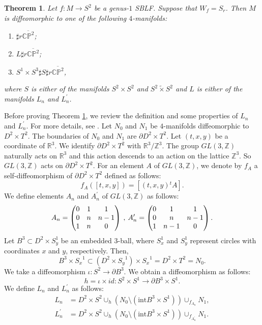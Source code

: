 \documentclass{amsart}
\theoremstyle{plain}
\newtheorem{thm}{Theorem}[section]
\theoremstyle{definition}
\begin{document}
\begin{thm}\label{aboutS_r}
Let $f:M\rightarrow S^2$ be a genus-$1$ SBLF. 
Suppose that $W_f=S_r$. 
Then $M$ is diffeomorphic to one of the following $4$-manifolds: 
\begin{enumerate}[(1)]

\item $\sharp r\overline{\mathbb{CP}^2}$; 

\item $L\sharp r\overline{\mathbb{CP}^2}$; 

\item $S^1\times S^3\sharp S \sharp r\overline{\mathbb{CP}^2}$, 

\end{enumerate}
\noindent
where $S$ is either of the manifolds $S^2\times S^2$ and $S^2\tilde{\times}S^2$ 
and $L$ is either of the manifolds $L_n$ and $L_n^\prime$. 

\end{thm}

Before proving Theorem \ref{aboutS_r}, we review the definition and some properties of $L_n$ and $L_n^\prime$. 
For more details, see \cite{Pao}. 
Let $N_0$ and $N_1$ be $4$-manifolds diffeomorphic to $D^2\times T^2$. 
The boundaries of $N_0$ and $N_1$ are $\partial D^2\times T^2$. 
Let $(t,x,y)$ be a coordinate of $\mathbb{R}^3$. 
We identify $\partial D^2\times T^2$ with $\mathbb{R}^3/\mathbb{Z}^3$. 
The group $GL(3,\mathbb{Z})$ naturally acts on $\mathbb{R}^3$ and this action descends to an action on the lattice $\mathbb{Z}^3$. 
So $GL(3,\mathbb{Z})$ acts on $\partial D^2\times T^2$. 
For an element $A$ of $GL(3,\mathbb{Z})$, we denote by $f_A$ a self-diffeomorphism of $\partial D^2\times T^2$ defined as follows: 
\[
f_A([t,x,y])=[(t,x,y){}^tA]. 
\]
We define elements $A_n$ and $A_n^\prime$ of $GL(3,\mathbb{Z})$ as follows: 
\[
A_n=
\begin{pmatrix}
0 & 1 & 1 \\
0 & n & n-1 \\
1 & n & 0 
\end{pmatrix}
\hspace{0.2em},\hspace{0.2em}
A_n^\prime=
\begin{pmatrix}
0 & 1 & 1 \\
0 & n & n-1 \\
1 & n-1 & 0 
\end{pmatrix}.
\]
\noindent
Let $B^3\subset D^2\times S_y^1$ be an embedded $3$-ball, 
where $S_x^1$ and $S_y^1$ represent circles with coordinates $x$ and $y$, respectively. 
Then, 
\[
B^3\times {S_x}^1\subset(D^2\times {S_y}^1)\times {S_x}^1=D^2\times T^2=N_0. 
\]
We take a diffeomorphism $\iota:S^2\rightarrow\partial B^3$. 
We obtain a diffeomorphism as follows: 
\[
h=\iota\times id:S^2\times S^1\rightarrow \partial B^3\times S^1. 
\]
We define $L_n$ and $L_n^\prime$ as follows: 
\begin{align*}
L_n & =D^2\times S^2\cup_h(N_0\setminus(\text{int}B^3\times S^1))\cup_{f_{A_n}}N_1, \\
L_n^\prime & =D^2\times S^2\cup_h(N_0\setminus(\text{int}B^3\times S^1))\cup_{f_{A_n^\prime}}N_1. 
\end{align*}
\end{document}
